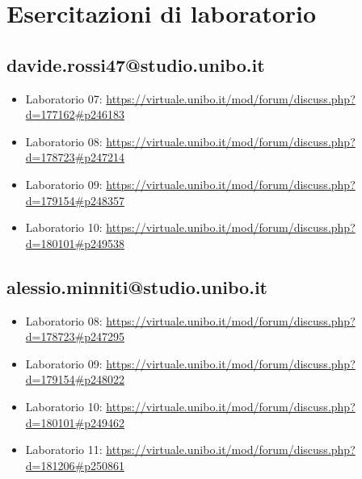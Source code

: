 \chapter{Esercitazioni di laboratorio}
\section{davide.rossi47@studio.unibo.it}
\begin{itemize}
    \item Laboratorio 07: \url{https://virtuale.unibo.it/mod/forum/discuss.php?d=177162#p246183}
    \item Laboratorio 08: \url{https://virtuale.unibo.it/mod/forum/discuss.php?d=178723#p247214}
    \item Laboratorio 09: \url{https://virtuale.unibo.it/mod/forum/discuss.php?d=179154#p248357}
    \item Laboratorio 10: \url{https://virtuale.unibo.it/mod/forum/discuss.php?d=180101#p249538}
\end{itemize}
\section{alessio.minniti@studio.unibo.it}
\begin{itemize}
    \item Laboratorio 08: \url{https://virtuale.unibo.it/mod/forum/discuss.php?d=178723#p247295}
    \item Laboratorio 09: \url{https://virtuale.unibo.it/mod/forum/discuss.php?d=179154#p248022}
    \item Laboratorio 10: \url{https://virtuale.unibo.it/mod/forum/discuss.php?d=180101#p249462}
    \item Laboratorio 11: \url{https://virtuale.unibo.it/mod/forum/discuss.php?d=181206#p250861}
\end{itemize}